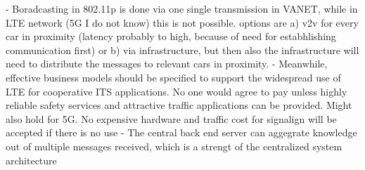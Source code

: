 \documentclass[conference,12pt,onecolumn]{IEEEtran}
\begin{document}
- Boradcasting in 802.11p is done via one single transmission in VANET, while in LTE network (5G I do not know) this is not possible. options are a) v2v for every car in proximity (latency probably to high, because of need for estabhlishing communication first) or b) via infrastructure, but then also the infrastructure will need to distribute the messages to relevant cars in proximity. \cite{araniti2013}
- Meanwhile, effective business models should be specified to support the widespread use of LTE for cooperative ITS applications. No one would agree to pay unless highly reliable safety services and attractive traffic applications can be provided. \cite{araniti2013} Might also hold for 5G. No expensive hardware and traffic cost for signalign will be accepted if there is no use
- The central back end server can aggegrate knowledge out of multiple messages received, which is a strengt of the centralized system architecture \cite{araniti2013}
\end{document}
